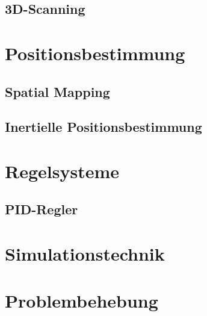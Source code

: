     \subsection{3D-Scanning}

\section{Positionsbestimmung}

    \subsection{Spatial Mapping}

    \subsection{Inertielle Positionsbestimmung}

\section{Regelsysteme}

    \subsection{PID-Regler}

\section{Simulationstechnik}

\section{Problembehebung}
